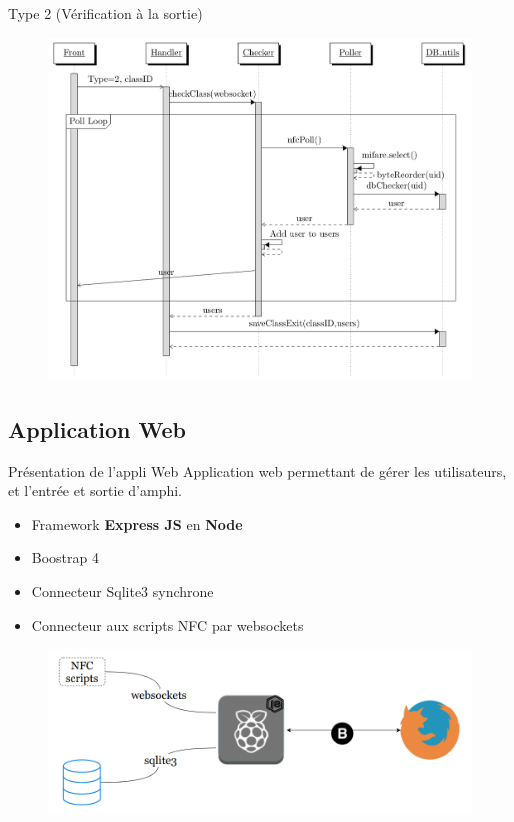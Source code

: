 \documentclass[aspectratio=169]{beamer}
\begin{document}
\begin{frame}{Type 2 (Vérification à la sortie)}
  \begin{figure}[]
    \includegraphics[height=.9\textheight]{../assets/nfcSeqExit.png}
  \end{figure}

\end{frame}

\subsection{Application Web}

\begin{frame}{Présentation de l'appli Web}
  Application web permettant de gérer les utilisateurs, et l'entrée et sortie d'amphi.
  \begin{itemize}
    \item Framework \textbf{Express JS} en \textbf{Node}
    \item Boostrap 4
    \item Connecteur Sqlite3 synchrone
    \item Connecteur aux scripts NFC par websockets
  \end{itemize}

  \begin{figure}
    \centering
    \includegraphics[width=.5\textwidth]{../assets/web_architecture.png}
  \end{figure}
\end{frame}
\end{document}
